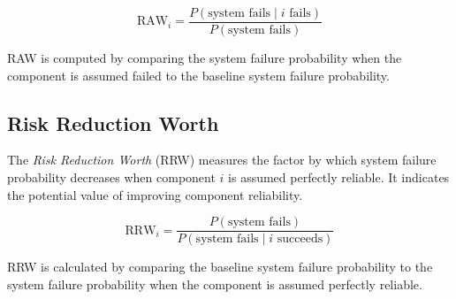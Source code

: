 \[
\text{RAW}_i = \frac{P(\text{system fails} \mid i \text{ fails})}{P(\text{system fails})}
\]

RAW is computed by comparing the system failure probability when the component is assumed failed to the baseline system failure probability.

\subsection{Risk Reduction Worth}
The \emph{Risk Reduction Worth} (RRW) measures the factor by which system failure probability decreases when component $i$ is assumed perfectly reliable. It indicates the potential value of improving component reliability.

\[
\text{RRW}_i = \frac{P(\text{system fails})}{P(\text{system fails} \mid i \text{ succeeds})}
\]

RRW is calculated by comparing the baseline system failure probability to the system failure probability when the component is assumed perfectly reliable.




